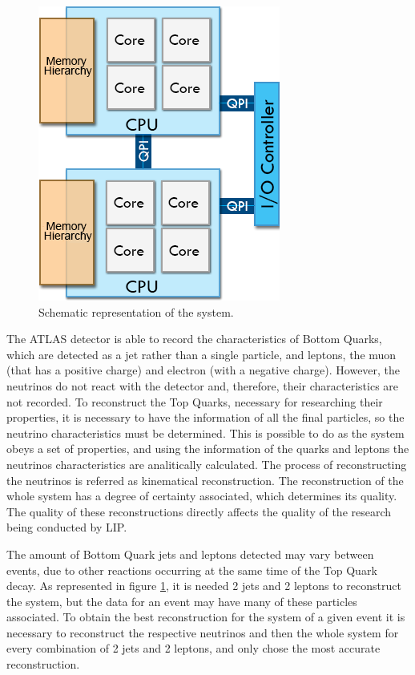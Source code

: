 \begin{figure}[!htp]
	\begin{center}
		\includegraphics[scale=0.5]{../../common/img/numa_qpi.png}
		\caption{Schematic representation of the \ttbar system.}
		\label{fig:TopQuarkDecay}
	\end{center}
\end{figure}

The ATLAS detector is able to record the characteristics of Bottom Quarks, which are detected as a jet rather than a single particle, and leptons, the muon (that has a positive charge) and electron (with a negative charge). However, the neutrinos do not react with the detector and, therefore, their characteristics are not recorded. To reconstruct the Top Quarks, necessary for researching their properties, it is necessary to have the information of all the final particles, so the neutrino characteristics must be determined. This is possible to do as the \ttbar system obeys a set of properties, and using the information of the quarks and leptons the neutrinos characteristics are analitically calculated. The process of reconstructing the neutrinos is referred as kinematical reconstruction. The reconstruction of the whole \ttbar system has a degree of certainty associated, which determines its quality. The quality of these reconstructions directly affects the quality of the research being conducted by LIP.

The amount of Bottom Quark jets and leptons detected may vary between events, due to other reactions occurring at the same time of the Top Quark decay. As represented in figure \ref{fig:TopQuarkDecay}, it is needed 2 jets and 2 leptons to reconstruct the \ttbar system, but the data for an event may have many of these particles associated. To obtain the best reconstruction for the \ttbar system of a given event it is necessary to reconstruct the respective neutrinos and then the whole system for every combination of 2 jets and 2 leptons, and only chose the most accurate reconstruction.

